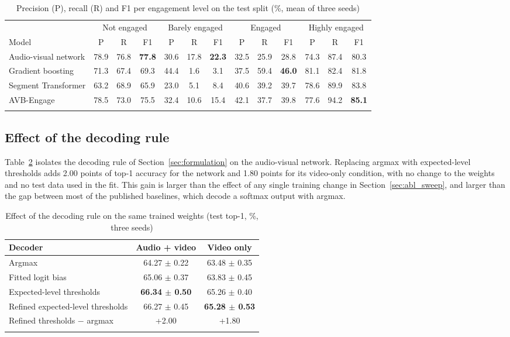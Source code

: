 \documentclass[pdflatex,iicol,sn-basic]{sn-jnl}
\newcommand{\ournet}{AVB-Engage}
\begin{document}
\begin{table}[t]
\caption{Precision (P), recall (R) and F1 per engagement level on the test split (\%, mean of three seeds)}\label{tab:levels}
\setlength{\tabcolsep}{3pt}
\begin{tabular*}{\textwidth}{@{\extracolsep\fill}lcccccccccccc}
\toprule
& \multicolumn{3}{c}{Not engaged} & \multicolumn{3}{c}{Barely engaged} & \multicolumn{3}{c}{Engaged} & \multicolumn{3}{c}{Highly engaged}\\
\cmidrule{2-4}\cmidrule{5-7}\cmidrule{8-10}\cmidrule{11-13}
Model & P & R & F1 & P & R & F1 & P & R & F1 & P & R & F1\\
\midrule
Audio-visual network & 78.9 & 76.8 & \textbf{77.8} & 30.6 & 17.8 & \textbf{22.3} & 32.5 & 25.9 & 28.8 & 74.3 & 87.4 & 80.3\\
Gradient boosting & 71.3 & 67.4 & 69.3 & 44.4 & 1.6 & 3.1 & 37.5 & 59.4 & \textbf{46.0} & 81.1 & 82.4 & 81.8\\
Segment Transformer & 63.2 & 68.9 & 65.9 & 23.0 & 5.1 & 8.4 & 40.6 & 39.2 & 39.7 & 78.6 & 89.9 & 83.8\\
\ournet & 78.5 & 73.0 & 75.5 & 32.4 & 10.6 & 15.4 & 42.1 & 37.7 & 39.8 & 77.6 & 94.2 & \textbf{85.1}\\
\botrule
\end{tabular*}
\end{table}

\subsection{Effect of the decoding rule}\label{sec:res_decoder}

Table~\ref{tab:decoder} isolates the decoding rule of Section~\ref{sec:formulation} on the audio-visual network. Replacing argmax with expected-level thresholds adds 2.00 points of top-1 accuracy for the network and 1.80 points for its video-only condition, with no change to the weights and no test data used in the fit. This gain is larger than the effect of any single training change in Section~\ref{sec:abl_sweep}, and larger than the gap between most of the published baselines, which decode a softmax output with argmax.

\begin{table}[t]
\caption{Effect of the decoding rule on the same trained weights (test top-1, \%, three seeds)}\label{tab:decoder}
\begin{tabular*}{\textwidth}{@{\extracolsep\fill}lcc}
\toprule
Decoder & Audio + video & Video only\\
\midrule
Argmax & 64.27 $\pm$ 0.22 & 63.48 $\pm$ 0.35\\
Fitted logit bias & 65.06 $\pm$ 0.37 & 63.83 $\pm$ 0.45\\
Expected-level thresholds & \textbf{66.34 $\pm$ 0.50} & 65.26 $\pm$ 0.40\\
Refined expected-level thresholds & 66.27 $\pm$ 0.45 & \textbf{65.28 $\pm$ 0.53}\\
\midrule
Refined thresholds $-$ argmax & +2.00 & +1.80\\
\botrule
\end{tabular*}
\end{table}
\end{document}
